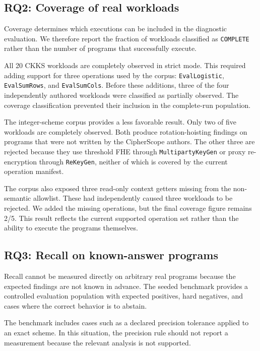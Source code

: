 \documentclass[sigconf,nonacm]{acmart}
\begin{document}
\subsection{RQ2: Coverage of real workloads}
\label{sec:rq2}

Coverage determines which executions can be included in the diagnostic
evaluation. We therefore report the fraction of workloads classified as
\texttt{COMPLETE} rather than the number of programs that successfully
execute.

All 20 CKKS workloads are completely observed in strict mode. This required
adding support for three operations used by the corpus:
\texttt{EvalLogistic}, \texttt{EvalSumRows}, and \texttt{EvalSumCols}. Before
these additions, three of the four independently authored workloads were
classified as partially observed. The coverage classification prevented their
inclusion in the complete-run population.

The integer-scheme corpus provides a less favorable result. Only two of five
workloads are completely observed. Both produce rotation-hoisting findings on
programs that were not written by the CipherScope authors. The other three are
rejected because they use threshold FHE through \texttt{MultipartyKeyGen} or
proxy re-encryption through \texttt{ReKeyGen}, neither of which is covered by
the current operation manifest.

The corpus also exposed three read-only context getters missing from the
non-semantic allowlist. These had independently caused three workloads to be
rejected. We added the missing operations, but the final coverage figure
remains 2/5. This result reflects the current supported operation set rather
than the ability to execute the programs themselves.

\subsection{RQ3: Recall on known-answer programs}
\label{sec:rq3}

Recall cannot be measured directly on arbitrary real programs because the
expected findings are not known in advance. The seeded benchmark provides a
controlled evaluation population with expected positives, hard negatives, and
cases where the correct behavior is to abstain.

The benchmark includes cases such as a declared precision tolerance applied to
an exact scheme. In this situation, the precision rule should not report a
measurement because the relevant analysis is not supported.
\end{document}
